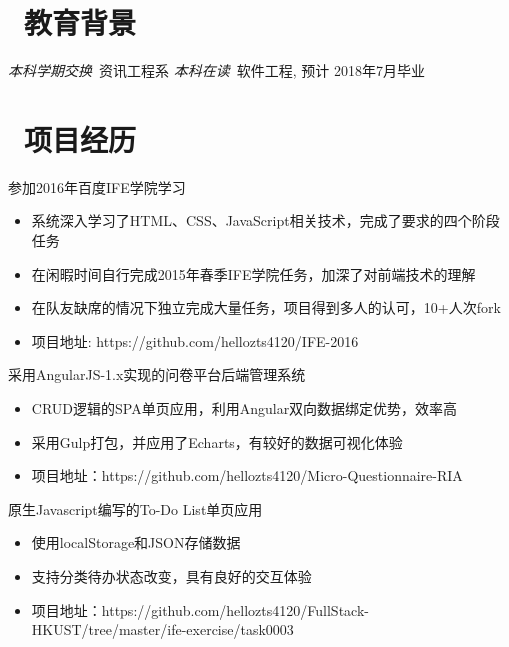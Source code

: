 \documentclass{resume}
\begin{document}


 
\section{\faGraduationCap\  教育背景}
\textit{本科学期交换}\ 资讯工程系
\textit{本科在读}\ 软件工程, 预计 2018年7月毕业

\section{\faUsers\ 项目经历}
参加2016年百度IFE学院学习
\begin{itemize}
  \item 系统深入学习了HTML、CSS、JavaScript相关技术，完成了要求的四个阶段任务
  \item 在闲暇时间自行完成2015年春季IFE学院任务，加深了对前端技术的理解
  \item 在队友缺席的情况下独立完成大量任务，项目得到多人的认可，10+人次fork
  \item 项目地址: https://github.com/hellozts4120/IFE-2016
\end{itemize}

\begin{onehalfspacing}
采用AngularJS-1.x实现的问卷平台后端管理系统
\begin{itemize}
  \item CRUD逻辑的SPA单页应用，利用Angular双向数据绑定优势，效率高
  \item 采用Gulp打包，并应用了Echarts，有较好的数据可视化体验
  \item 项目地址：https://github.com/hellozts4120/Micro-Questionnaire-RIA
\end{itemize}
\end{onehalfspacing}

\begin{onehalfspacing}
原生Javascript编写的To-Do List单页应用
\begin{itemize}
  \item 使用localStorage和JSON存储数据
  \item 支持分类待办状态改变，具有良好的交互体验
  \item 项目地址：https://github.com/hellozts4120/FullStack-HKUST/tree/master/ife-exercise/task0003
\end{itemize}
\end{onehalfspacing}
\end{document}
